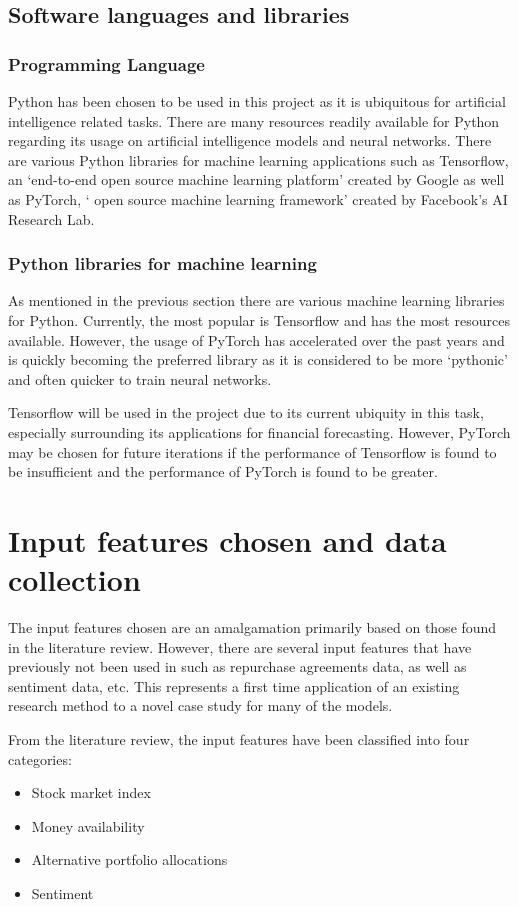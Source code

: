 \subsection{Software languages and libraries}
\subsubsection{Programming Language}
Python has been chosen to be used in this project as it is ubiquitous for artificial intelligence related
tasks. There are many resources readily available for Python regarding its usage on artificial
intelligence models and neural networks. There are various Python libraries for machine learning applications
such as Tensorflow, an `end-to-end open source machine learning platform' created by Google as well as
PyTorch, ` open source machine learning framework' created by Facebook's AI Research Lab.

\subsubsection{Python libraries for machine learning}
As mentioned in the previous section there are various machine learning libraries for Python. Currently, the
most popular is Tensorflow and has the most resources available.
However, the usage of PyTorch has accelerated over the past years and is quickly becoming the preferred
library as it is considered to be more `pythonic' and often quicker to train neural networks.

Tensorflow will be used in the project due to its current ubiquity in this task, especially surrounding
its applications for financial forecasting. However, PyTorch may be chosen for future iterations if
the performance of Tensorflow is found to be insufficient and the performance of PyTorch is found to be
greater.

\section{Input features chosen and data collection}\label{ssec:input_feature_chosen}
The input features chosen are an amalgamation primarily based on those found in the literature review.
However, there are several input features that have previously not been used in such as repurchase agreements
data, as well as sentiment data, etc. This represents a first time application of an existing research method
to a novel case study for many of the models.

From the literature review, the input features have been classified into four categories:
\begin{itemize}
    \item Stock market index
    \item Money availability
    \item Alternative portfolio allocations
    \item Sentiment
\end{itemize}

